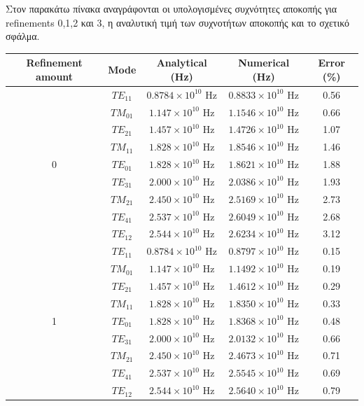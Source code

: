 \documentclass[10pt, letterpaper]{article}
\newcommand{\en}{\selectlanguage{english}}
\newcommand{\gr}{\selectlanguage{greek}}
\begin{document}
Στον παρακάτω πίνακα αναγράφονται οι υπολογισμένες συχνότητες αποκοπής για \en refinements \gr 0,1,2 και 3, η αναλυτική τιμή των 
συχνοτήτων αποκοπής και το σχετικό σφάλμα. 

\en 
\begin{center}
  

  \begin{tabular}{|c|c|c|c|c|}
    \hline
    \textbf{Refinement amount} & \textbf{Mode} & \textbf{Analytical (Hz)} & \textbf{Numerical (Hz)} & \textbf{Error (\%)} \\
    \hline
    \multirow{9}{*}{0} 
    & $TE_{11}$ & $0.8784 \times 10^{10}$ Hz & $0.8833 \times 10^{10}$ Hz & 0.56 \\
    & $TM_{01}$ & $1.147 \times 10^{10}$ Hz  & $1.1546 \times 10^{10}$ Hz & 0.66 \\
    & $TE_{21}$ & $1.457 \times 10^{10}$ Hz  & $1.4726 \times 10^{10}$ Hz & 1.07 \\
    & $TM_{11}$ & $1.828 \times 10^{10}$ Hz  & $1.8546 \times 10^{10}$ Hz & 1.46 \\
    & $TE_{01}$ & $1.828 \times 10^{10}$ Hz  & $1.8621 \times 10^{10}$ Hz & 1.88 \\
    & $TE_{31}$ & $2.000 \times 10^{10}$ Hz  & $2.0386 \times 10^{10}$ Hz & 1.93 \\
    & $TM_{21}$ & $2.450 \times 10^{10}$ Hz  & $2.5169 \times 10^{10}$ Hz & 2.73 \\
    & $TE_{41}$ & $2.537 \times 10^{10}$ Hz  & $2.6049 \times 10^{10}$ Hz & 2.68 \\
    & $TE_{12}$ & $2.544 \times 10^{10}$ Hz  & $2.6234 \times 10^{10}$ Hz & 3.12 \\
    \hline
    
    \multirow{9}{*}{1} 
    & $TE_{11}$ & $0.8784 \times 10^{10}$ Hz & $0.8797 \times 10^{10}$ Hz & 0.15 \\
    & $TM_{01}$ & $1.147 \times 10^{10}$ Hz  & $1.1492 \times 10^{10}$ Hz & 0.19 \\
    & $TE_{21}$ & $1.457 \times 10^{10}$ Hz  & $1.4612 \times 10^{10}$ Hz & 0.29 \\
    & $TM_{11}$ & $1.828 \times 10^{10}$ Hz  & $1.8350 \times 10^{10}$ Hz & 0.33 \\
    & $TE_{01}$ & $1.828 \times 10^{10}$ Hz  & $1.8368 \times 10^{10}$ Hz & 0.48 \\
    & $TE_{31}$ & $2.000 \times 10^{10}$ Hz  & $2.0132 \times 10^{10}$ Hz & 0.66 \\
    & $TM_{21}$ & $2.450 \times 10^{10}$ Hz  & $2.4673 \times 10^{10}$ Hz & 0.71 \\
    & $TE_{41}$ & $2.537 \times 10^{10}$ Hz  & $2.5545 \times 10^{10}$ Hz & 0.69 \\
    & $TE_{12}$ & $2.544 \times 10^{10}$ Hz  & $2.5640 \times 10^{10}$ Hz & 0.79 \\
    \hline
    

\end{tabular}
\end{center}
\end{document}
